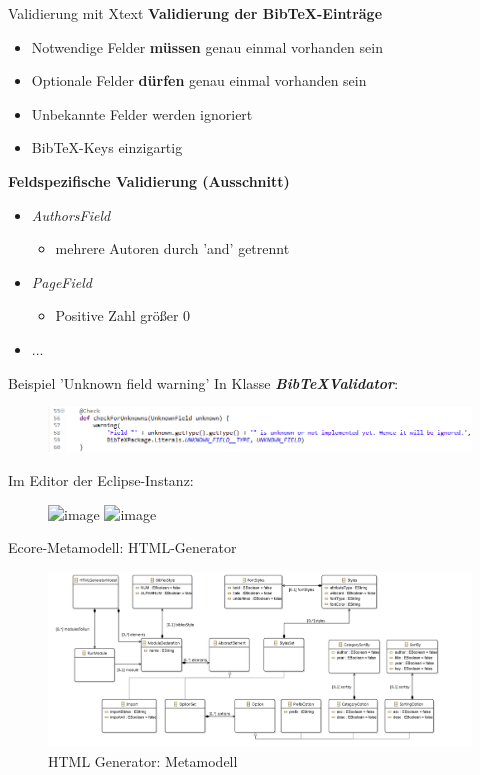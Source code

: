 \documentclass[fleqn,11pt,aspectratio=43]{beamer}
\begin{document}
\begin{frame}{Validierung mit Xtext}
\textbf{Validierung der BibTeX-Einträge}
\begin{itemize}
\item Notwendige Felder \textbf{müssen} genau einmal vorhanden sein
\item Optionale Felder \textbf{dürfen} genau einmal vorhanden sein
\item Unbekannte Felder werden ignoriert
\item BibTeX-Keys einzigartig
\end{itemize}

\textbf{Feldspezifische Validierung (Ausschnitt)}
\begin{itemize}
\item \textit{AuthorsField}
\begin{itemize}
\item mehrere Autoren durch 'and' getrennt
\end{itemize}
\item \textit{PageField}
\begin{itemize}
\item Positive Zahl größer 0
\end{itemize}
\item ...
\end{itemize}
\end{frame}

\begin{frame}{Beispiel 'Unknown field warning'}
In Klasse \textbf{\it BibTeXValidator}:
\begin{figure}
\includegraphics[scale=0.5]{../validation_fragment.png} 
\end{figure} 

Im Editor der Eclipse-Instanz: 
\begin{figure}
\includegraphics<1>[scale=0.5]{../instance_unknownfield1.png} 
\includegraphics<2>[scale=0.5]{../instance_unknownfield2.png} 
\end{figure} 

\end{frame}

\begin{frame}{Ecore-Metamodell: HTML-Generator}
\begin{figure}
\includegraphics[scale=0.25]{../htmlgen_ecore.png} 
\caption{HTML Generator: Metamodell}
\end{figure}   
\end{frame}
\end{document}
